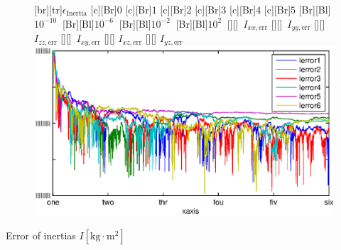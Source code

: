 \documentclass[student,noshadow]{ITRslides}
\newcommand{\scr}[1]{\mathrm{#1}}
\begin{document}
\begin{frame}
\begin{columns}
\begin{column}{0.5\textwidth}
\begin{figure}
				[br][tr]{$\epsilon_{\scr{Inertia}}$}
				[c][Br]{$0$}
				[c][Br]{$1$}
				[c][Br]{$2$}
				[c][Br]{$3$}
				[c][Br]{$4$}
				[c][Br]{$5$}
				[Br][Bl]{$10^{-10}\  $}
				[Br][Bl]{$10^{-6}\  $}
				[Br][Bl]{$10^{-2}\  $}
				[Br][Bl]{$10^2\  $}
				[][]{\tiny \  $I_{xx,\scr{err}}$}
				[][]{\tiny \  $I_{yy,\scr{err}}$}
				[][]{\tiny \  $I_{zz,\scr{err}}$}
				[][]{\tiny \  $I_{xy,\scr{err}}$}
				[][]{\tiny \hspace{0.5cm} $I_{xz,\scr{err}}$}
				[][]{\tiny \hspace{0.5cm} $I_{yz,\scr{err}}$}
				\includegraphics[width=\textwidth]{fig/inertia_multi_noise.eps}
			\end{figure}
			Error of inertias $I \left[\mathrm{kg} \cdot \mathrm{m}^2\right]$
		\end{column}
	\end{columns}
\end{frame}
\end{document}
